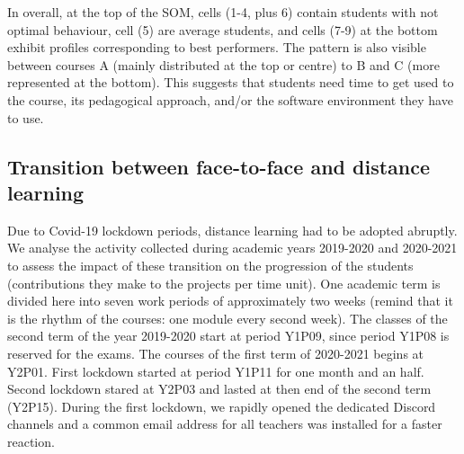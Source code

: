 \documentclass[
]{article}
\begin{document}
In overall, at the top of the SOM, cells (1-4, plus 6) contain students
with not optimal behaviour, cell (5) are average students, and cells
(7-9) at the bottom exhibit profiles corresponding to best performers.
The pattern is also visible between courses A (mainly distributed at the
top or centre) to B and C (more represented at the bottom). This
suggests that students need time to get used to the course, its
pedagogical approach, and/or the software environment they have to use.

\hypertarget{transition-between-face-to-face-and-distance-learning}{%
\subsection{Transition between face-to-face and distance
learning}\label{transition-between-face-to-face-and-distance-learning}}

Due to Covid-19 lockdown periods, distance learning had to be adopted
abruptly. We analyse the activity collected during academic years
2019-2020 and 2020-2021 to assess the impact of these transition on the
progression of the students (contributions they make to the projects per
time unit). One academic term is divided here into seven work periods of
approximately two weeks (remind that it is the rhythm of the courses:
one module every second week). The classes of the second term of the
year 2019-2020 start at period Y1P09, since period Y1P08 is reserved for
the exams. The courses of the first term of 2020-2021 begins at Y2P01.
First lockdown started at period Y1P11 for one month and an half. Second
lockdown stared at Y2P03 and lasted at then end of the second term
(Y2P15). During the first lockdown, we rapidly opened the dedicated
Discord channels and a common email address for all teachers was
installed for a faster reaction.
\end{document}
